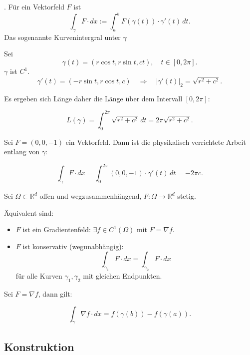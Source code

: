 \documentclass[11pt, a4paper]{article}
\begin{document}
\begin{definition}. Für ein Vektorfeld $F$ ist
\[
\int_\gamma F \cdot dx
:=
\int_a^b F(\gamma(t)) \cdot \gamma'(t) \, dt.
\]
Das sogenannte Kurvenintergral unter $\gamma$
\end{definition}


\begin{example} Sei 
\[
\gamma(t) = (r\cos t, r\sin t, ct), \quad t \in [0,2\pi].
\]
$\gamma$ ist $ C^1$.
\[
\gamma'(t) = (-r\sin t, r\cos t, c)
\quad \Rightarrow \quad
|\gamma'(t)|_2 = \sqrt{r^2 + c^2}.
\]

Es ergeben sich Länge daher die Länge über dem Intervall $[0,2\pi]$:

\[
L(\gamma)
=
\int_0^{2\pi} \sqrt{r^2 + c^2}\, dt
=
2\pi \sqrt{r^2 + c^2}.
\]

Sei $F=(0,0,-1)$ ein Vektorfeld. Dann ist die physikalisch verrichtete Arbeit entlang von $\gamma$:

\[
\int_\gamma F \cdot dx
=
\int_0^{2\pi} (0,0,-1)\cdot \gamma'(t)\, dt
=
-2\pi c.
\]

\end{example}

\begin{theorem}  Sei $\Omega \subset \mathbb{R}^d$ offen und wegzusammenhängend,
$F:\Omega \to \mathbb{R}^d$ stetig.

Äquivalent sind:

\begin{itemize}
\item[(a)] $F$ ist ein Gradientenfeld: $\exists f \in C^1(\Omega)$ mit $F=\nabla f$.
\item[(b)] $F$ ist konservativ (wegunabhängig):
\[
\int_{\gamma_1} F\cdot dx
=
\int_{\gamma_2} F\cdot dx
\]
für alle Kurven $\gamma_1,\gamma_2$ mit gleichen Endpunkten.
\end{itemize}
\end{theorem}


\begin{lemma} Sei $F=\nabla f$, dann gilt:

\[
\int_\gamma \nabla f \cdot dx
=
f(\gamma(b)) - f(\gamma(a)).
\]

\end{lemma}




\vspace{0.3cm} \par \subsection{Konstruktion}
\end{document}
